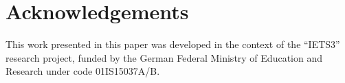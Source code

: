 \documentclass{llncs}
\begin{document}
 



 



%



 

\section*{Acknowledgements}
This work presented in this paper was developed in the context of the
``IETS3'' research project, funded by the German Federal Ministry of Education
and Research under code 01IS15037A/B.




\end{document}

